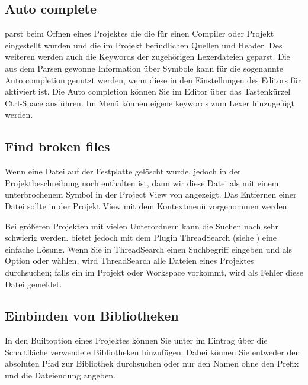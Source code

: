 \subsection{Auto complete}

\codeblocks parst beim Öffnen eines Projektes die  die für einen Compiler oder Projekt eingestellt wurden und die im Projekt befindlichen Quellen und Header. Des weiteren werden auch die Keywords der zugehörigen Lexerdateien geparst. Die aus dem Parsen gewonne Information über Symbole kann für die sogenannte Auto completion genutzt werden, wenn diese in den Einstellungen des Editors für \codeblocks aktiviert ist. Die Auto completion können Sie im Editor über das Tastenkürzel Ctrl-Space ausführen. Im Menü  können eigene keywords zum Lexer hinzugefügt werden.

\subsection{Find broken files}

Wenn eine Datei auf der Festplatte gelöscht wurde, jedoch in der Projektbeschreibung  noch enthalten ist, dann wir diese Datei als  mit einem unterbrochenem Symbol in der Project View von \codeblocks angezeigt. Das Entfernen einer Datei sollte in der Projekt View mit dem Kontextmenü  vorgenommen werden.

Bei größeren Projekten mit vielen Unterordnern kann die Suchen nach  sehr schwierig werden. \codeblocks bietet jedoch mit dem Plugin ThreadSearch (siehe ) eine einfache Lösung. Wenn Sie in ThreadSearch einen Suchbegriff eingeben und als Option  oder  wählen, wird ThreadSearch alle Dateien eines Projektes durchsuchen; falls ein  im Projekt oder Workspace vorkommt, wird als Fehler diese Datei gemeldet.

\subsection{Einbinden von Bibliotheken}

In den Builtoption eines Projektes können Sie unter  im Eintrag  über die Schaltfläche  verwendete Bibliotheken hinzufügen. Dabei können Sie entweder den absoluten Pfad zur Bibliothek durchsuchen oder nur den Namen ohne den Prefix  und die Dateiendung angeben.

